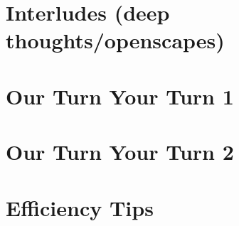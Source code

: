 \documentclass[]{book}
\begin{document}
\hypertarget{interludes-deep-thoughtsopenscapes-7}{%
\section{Interludes (deep thoughts/openscapes)}\label{interludes-deep-thoughtsopenscapes-7}}

\hypertarget{our-turn-your-turn-1-4}{%
\section{Our Turn Your Turn 1}\label{our-turn-your-turn-1-4}}

\hypertarget{our-turn-your-turn-2-5}{%
\section{Our Turn Your Turn 2}\label{our-turn-your-turn-2-5}}

\hypertarget{efficiency-tips-7}{%
\section{Efficiency Tips}\label{efficiency-tips-7}}


\end{document}
